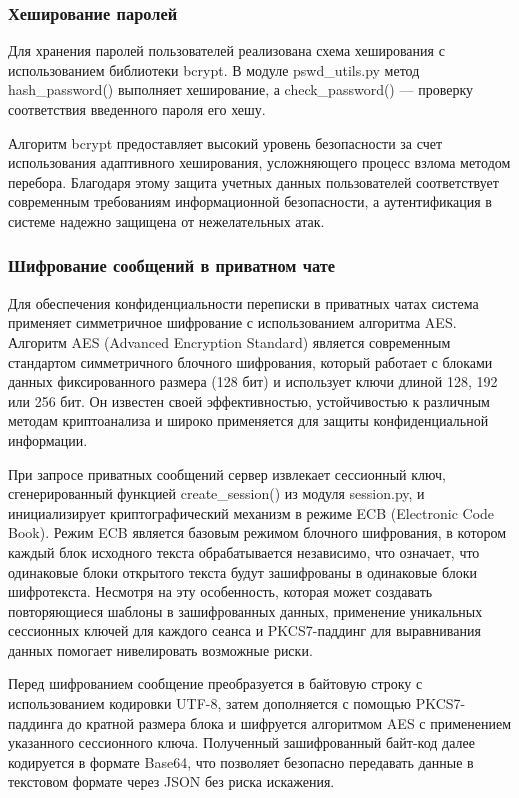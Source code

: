 \subsubsection{Хеширование паролей}
Для хранения паролей пользователей реализована схема хеширования с использованием библиотеки bcrypt. В модуле pswd\_utils.py метод hash\_password() выполняет хеширование, а check\_password() — проверку соответствия введенного пароля его хешу.

Алгоритм bcrypt предоставляет высокий уровень безопасности за счет использования адаптивного хеширования, усложняющего процесс взлома методом перебора. Благодаря этому защита учетных данных пользователей соответствует современным требованиям информационной безопасности, а аутентификация в системе надежно защищена от нежелательных атак.

\subsubsection{Шифрование сообщений в приватном чате}
Для обеспечения конфиденциальности переписки в приватных чатах система применяет симметричное шифрование с использованием алгоритма AES. Алгоритм AES (Advanced Encryption Standard) является современным стандартом симметричного блочного шифрования, который работает с блоками данных фиксированного размера (128 бит) и использует ключи длиной 128, 192 или 256 бит. Он известен своей эффективностью, устойчивостью к различным методам криптоанализа и широко применяется для защиты конфиденциальной информации.

При запросе приватных сообщений сервер извлекает сессионный ключ, сгенерированный функцией create\_session() из модуля session.py, и инициализирует криптографический механизм в режиме ECB (Electronic Code Book). Режим ECB является базовым режимом блочного шифрования, в котором каждый блок исходного текста обрабатывается независимо, что означает, что одинаковые блоки открытого текста будут зашифрованы в одинаковые блоки шифротекста. Несмотря на эту особенность, которая может создавать повторяющиеся шаблоны в зашифрованных данных, применение уникальных сессионных ключей для каждого сеанса и PKCS7-паддинг для выравнивания данных помогает нивелировать возможные риски.

Перед шифрованием сообщение преобразуется в байтовую строку с использованием кодировки UTF-8, затем дополняется с помощью PKCS7-паддинга до кратной размера блока и шифруется алгоритмом AES с применением указанного сессионного ключа. Полученный зашифрованный байт-код далее кодируется в формате Base64, что позволяет безопасно передавать данные в текстовом формате через JSON без риска искажения.


